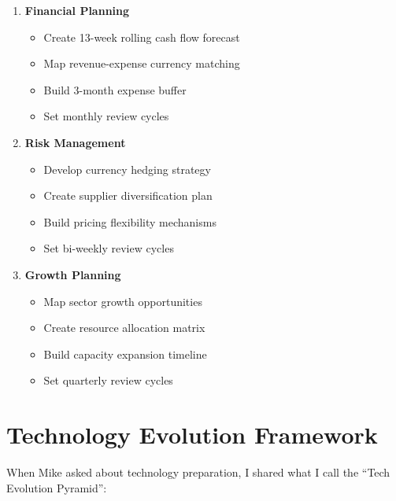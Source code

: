 \begin{tcolorbox}[colback=white,colframe=primarydark,title=\textbf{Economic Rebalancing: Action Steps}]
\begin{enumerate}
    \item \textbf{Financial Planning}
    \begin{itemize}
        \item Create 13-week rolling cash flow forecast
        \item Map revenue-expense currency matching
        \item Build 3-month expense buffer
        \item Set monthly review cycles
    \end{itemize}

    \item \textbf{Risk Management}
    \begin{itemize}
        \item Develop currency hedging strategy
        \item Create supplier diversification plan
        \item Build pricing flexibility mechanisms
        \item Set bi-weekly review cycles
    \end{itemize}

    \item \textbf{Growth Planning}
    \begin{itemize}
        \item Map sector growth opportunities
        \item Create resource allocation matrix
        \item Build capacity expansion timeline
        \item Set quarterly review cycles
    \end{itemize}
\end{enumerate}
\end{tcolorbox}

\section{Technology Evolution Framework}\label{sec:technology-evolution}

When Mike asked about technology preparation, I shared what I call the ``Tech Evolution Pyramid'':

